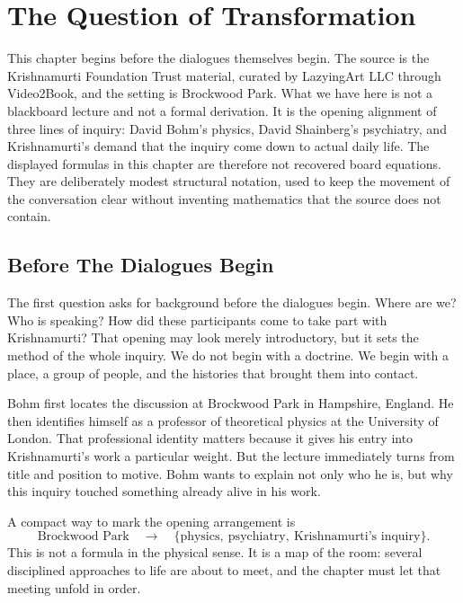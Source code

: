 \chapter{The Question of Transformation}

This chapter begins before the dialogues themselves begin. The source is the Krishnamurti Foundation Trust material, curated by LazyingArt LLC through Video2Book, and the setting is Brockwood Park. What we have here is not a blackboard lecture and not a formal derivation. It is the opening alignment of three lines of inquiry: David Bohm's physics, David Shainberg's psychiatry, and Krishnamurti's demand that the inquiry come down to actual daily life. The displayed formulas in this chapter are therefore not recovered board equations. They are deliberately modest structural notation, used to keep the movement of the conversation clear without inventing mathematics that the source does not contain.

\section{Before The Dialogues Begin}

The first question asks for background before the dialogues begin. Where are we? Who is speaking? How did these participants come to take part with Krishnamurti? That opening may look merely introductory, but it sets the method of the whole inquiry. We do not begin with a doctrine. We begin with a place, a group of people, and the histories that brought them into contact.

Bohm first locates the discussion at Brockwood Park in Hampshire, England. He then identifies himself as a professor of theoretical physics at the University of London. That professional identity matters because it gives his entry into Krishnamurti's work a particular weight. But the lecture immediately turns from title and position to motive. Bohm wants to explain not only who he is, but why this inquiry touched something already alive in his work.

A compact way to mark the opening arrangement is
\begin{equation}
\text{Brockwood Park}
\quad\longrightarrow\quad
\{\text{physics},\ \text{psychiatry},\ \text{Krishnamurti's inquiry}\}.
\end{equation}
This is not a formula in the physical sense. It is a map of the room: several disciplined approaches to life are about to meet, and the chapter must let that meeting unfold in order.

